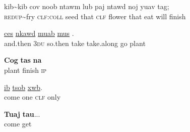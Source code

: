 \documentclass[output=paper]{LSP/langsci}
\begin{document}
\begin{exe}
 \label{JaexApp28}
\gll kib{\textasciitilde}kib cov noob ntawm lub paj ntawd noj yuav tag;\\
     \textsc{redup}{\textasciitilde}fry \textsc{clf:coll} seed that \textsc{clf} flower that eat will finish\\
\glt {}
\end{exe}

\begin{exe}
 \label{JaexApp29}
\gll  \underline{ces}  \underline{nkawd}  \underline{}  \underline{muab}  \underline{}  \underline{mus}  \underline{}.\\
     and.then \textsc{3du} so.then take take.along go plant\\
\glt {}
\end{exe}

\begin{exe}
 \label{JaexApp30}
\gll \textbf{Cog} \textbf{tas} \textbf{na}\\
     plant finish \textsc{ip}\\
\glt {}
\end{exe}


\begin{exe}
 \label{JaexApp31}
\gll \underline{} \underline{ib} \underline{tsob} \underline{xwb}.\\
     come one \textsc{clf} only\\
\glt {}
\end{exe}

\begin{exe}
 \label{JaexApp32}
\gll \textbf{Tuaj} \textbf{tau}...\\
     come get\\
\glt {}
\end{exe}
\end{document}
